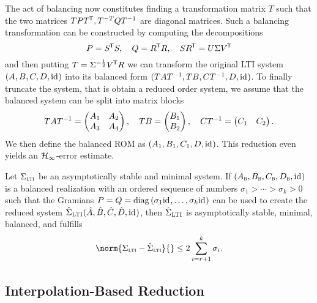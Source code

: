 The act of balancing now constitutes finding a transformation matrix $T$ such that the two matrices $T P T\trans, T\inv[T] Q T\inv$ are diagonal matrices.
Such a balancing transformation can be constructed by computing the decompositions
\begin{equation}\label{eq:balancing}
    P = S\trans S,\quad Q = R\trans R,\quad S R\trans = U \Sigma V\trans
\end{equation}
and then putting $T = \Sigma\inv[\frac{1}{2}] V\trans R$ we can transform the original LTI system $(A, B, C, D, \id)$ into its balanced form $(T A T\inv, T B, C T\inv, D, \id)$.
To finally truncate the system, that is obtain a reduced order system, we assume that the balanced system can be split into matrix blocks
\begin{equation*}
    T A T\inv = \begin{pmatrix}
        A_1 & A_2 \\
        A_3 & A_4
    \end{pmatrix},\quad T B = \begin{pmatrix}
        B_1 \\
        B_2
    \end{pmatrix},\quad C T\inv = \begin{pmatrix}
        C_1 & C_2
    \end{pmatrix}.
\end{equation*}
We then define the balanced ROM as $(A_1, B_1, C_1, D, \id)$.
This reduction even yields an $\mcl{H}_\infty$-error estimate.

\begin{theorem}[{Cf.~\cite[Theorem~6.4]{BB2017}}]\label{thm:h-inf-error}
    Let $\Sigma_{\msc{lti}}$ be an asymptotically stable and minimal system.
    If $(A_{\msc{b}}, B_{\msc{b}}, C_{\msc{b}}, D_{\msc{b}}, \id)$ is a balanced realization with an ordered sequence of numbers $\sigma_1 > \cdots > \sigma_k > 0$ such that the Gramians $P = Q = \diag{\sigma_1 \id, \dots, \sigma_k \id}$ can be used to create the reduced system $\hat{\Sigma}_{\msc{LTI}} (\hat{A}, \hat{B}, \hat{C}, \hat{D}, \id)$, then $\hat{\Sigma}_{\msc{LTI}}$ is asymptotically stable, minimal, balanced, and fulfills
    \begin{equation*}
        \norm{\Sigma_{\msc{lti}} - \hat{\Sigma}_{\msc{lti}}}{} \leq 2 \sum\limits_{i = r + 1}^k \sigma_i.
    \end{equation*}
\end{theorem}

\subsection{Interpolation-Based Reduction}\label{subsec:interpolation-reduction}

